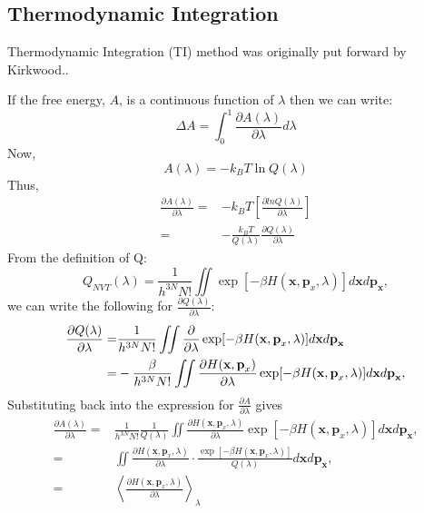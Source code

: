 \subsection{Thermodynamic Integration\label{Sec:FEM:TI}}
Thermodynamic Integration (TI) method was originally put forward by Kirkwood.\cite{KirkwoodJCP1935}. 
	
If the free energy, $A$, is a continuous function of $\lambda$ then we can write:
\begin{equation}
\Delta A = \int_{0}^{1} \frac{\partial{A(\lambda)}}{\partial{\lambda}} d\lambda
\label{Eq:FEM:TI:deltaA1TI}
\end{equation} 
Now,
\begin{equation}
A(\lambda) = -k_{B}T\ln Q(\lambda)
\label{Eq:FEM:TI:Alambda}
\end{equation} 
Thus,
\begin{align}
\frac{\partial{A(\lambda)}}{\partial{\lambda}} =& -k_{B}T \left[ \frac{\partial{lnQ(\lambda)}}{\partial{\lambda}} \right] \\
=&-\frac{k_{B}T}{Q(\lambda)}\frac{\partial{Q(\lambda)}}{\partial{\lambda}}
\label{Eq:FEM:TI:deltaA2TI}
\end{align} 
From the definition of Q:
\begin{equation}
Q_{NVT}(\lambda) = \frac{1}{{h}^{3N}N!} \iint \exp[-\beta H(\textbf{x},\textbf{p}_{x},\lambda)] d\textbf{x}d\textbf{p}_\textbf{x},
\label{Eq:FEM:TI:PFTI}
\end{equation}
we can write the following for $\frac{\partial{Q(\lambda)}}{\partial{\lambda}}$:
\begin{align}
\frac{\partial{Q(\lambda)}}{\partial{\lambda}} =&\frac{1}{{h}^{3N}N!} \iint \frac{\partial}{\partial{\lambda}}\exp[-\beta H(\textbf{x},\textbf{p}_{x},\lambda)] d\textbf{x}d\textbf{p}_\textbf{x}\notag\\
=& -\frac{\beta}{{h}^{3N}N!} \iint \frac{\partial{H(\textbf{x},\textbf{p}_{x})}}{\partial{\lambda}}\exp[-\beta H(\textbf{x},\textbf{p}_{x},\lambda)] d\textbf{x}d\textbf{p}_\textbf{x},
\label{Eq:FEM:TI:PPF2}
\end{align}
Substituting back into the expression for $\frac{\partial{A}}{\partial{\lambda}}$ gives
\begin{align}
\frac{\partial{A(\lambda)}}{\partial{\lambda}} =& \frac{1}{{h}^{3N}N!}\frac{1}{Q(\lambda)} \iint \frac{\partial{H(\textbf{x},\textbf{p}_{x},\lambda)}}{\partial{\lambda}}\exp[-\beta H(\textbf{x},\textbf{p}_{x},\lambda)] d\textbf{x}d\textbf{p}_\textbf{x}, \\
=& \iint \frac{\partial{H(\textbf{x},\textbf{p}_{x},\lambda)}}{\partial{\lambda}}\cdot\frac{\exp[-\beta H(\textbf{x},\textbf{p}_{x},\lambda)]}{Q(\lambda)} d\textbf{x}d\textbf{p}_\textbf{x}, \\
=& \left \langle \frac{\partial{H(\textbf{x},\textbf{p}_{x}, \lambda)}}{\partial{\lambda}} \right \rangle_{\lambda}
\label{Eq:FEM:TI:PA2}
\end{align}
